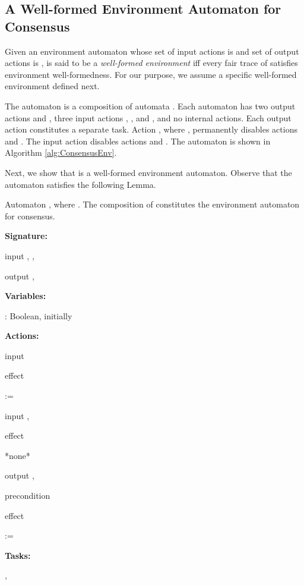 \documentclass[11pt]{article}
\numberwithin{theorem}{section}
\newcommand{\tab}{\hspace{5mm}}
\begin{document}
\subsection{A Well-formed Environment Automaton for Consensus}\label{subsec:conEnvDef}
Given an environment automaton  whose set of input actions is  and set of output actions is ,  is said to be a \emph{well-formed environment} iff every fair trace  of  satisfies environment well-formedness. For our purpose, we assume a specific well-formed environment  defined next.


The automaton  is a composition of  automata . Each automaton  has two output actions  and , three input actions , , and , and no internal actions. Each output action constitutes a separate task. Action , where , permanently disables actions  and . The  input action disables  actions  and . The automaton  is shown in Algorithm \ref{alg:ConsensusEnv}.

Next, we show that  is a well-formed environment automaton. Observe that the automaton  satisfies the following Lemma.



\begin{algorithm}\footnotesize
\caption{Automaton , where . The composition of  constitutes the environment automaton  for consensus.}
\label{alg:ConsensusEnv}

\textbf{Signature:}

\tab input , , 

\tab output , 

\textbf{Variables:}

\tab : Boolean, initially 


\textbf{Actions:}

\tab input 

\tab effect

\tab \tab  := 

\tab

\tab input , 

\tab effect

\tab \tab *none*

\tab

\tab output , 

\tab precondition

\tab \tab 

\tab effect

\tab \tab  := 

\tab

\textbf{Tasks:}

\tab , 

\end{algorithm}
\end{document}
